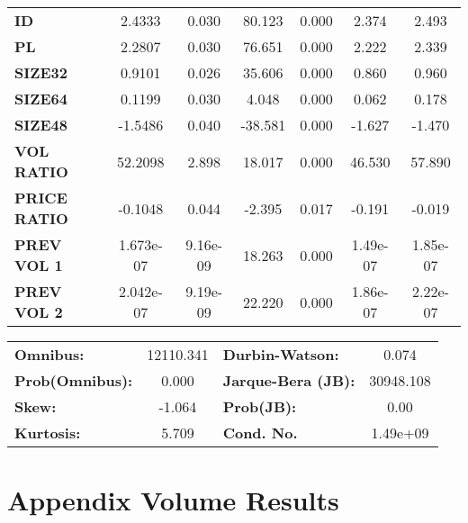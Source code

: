 \documentclass{article}
\begin{document}
\begin{center}
\begin{tabular}{lcccccc}
\textbf{ID}    &       2.4333  &        0.030     &    80.123  &         0.000        &        2.374    &        2.493     \\
\textbf{PL}    &       2.2807  &        0.030     &    76.651  &         0.000        &        2.222    &        2.339     \\
\textbf{SIZE32}    &       0.9101  &        0.026     &    35.606  &         0.000        &        0.860    &        0.960     \\
\textbf{SIZE64}   &       0.1199  &        0.030     &     4.048  &         0.000        &        0.062    &        0.178     \\
\textbf{SIZE48}   &      -1.5486  &        0.040     &   -38.581  &         0.000        &       -1.627    &       -1.470     \\
\textbf{VOL RATIO}   &      52.2098  &        2.898     &    18.017  &         0.000        &       46.530    &       57.890     \\
\textbf{PRICE RATIO}   &      -0.1048  &        0.044     &    -2.395  &         0.017        &       -0.191    &       -0.019     \\
\textbf{PREV VOL 1}   &    1.673e-07  &     9.16e-09     &    18.263  &         0.000        &     1.49e-07    &     1.85e-07     \\
\textbf{PREV VOL 2}   &    2.042e-07  &     9.19e-09     &    22.220  &         0.000        &     1.86e-07    &     2.22e-07     \\
\bottomrule
\end{tabular}
\begin{tabular}{lclc}
\textbf{Omnibus:}       & 12110.341 & \textbf{  Durbin-Watson:     } &     0.074  \\
\textbf{Prob(Omnibus):} &    0.000  & \textbf{  Jarque-Bera (JB):  } & 30948.108  \\
\textbf{Skew:}          &   -1.064  & \textbf{  Prob(JB):          } &      0.00  \\
\textbf{Kurtosis:}      &    5.709  & \textbf{  Cond. No.          } &  1.49e+09  \\
\bottomrule
\end{tabular}
\end{center}


{}


\appendix

\section{Appendix Volume Results}
\end{document}
